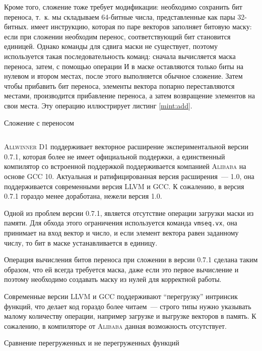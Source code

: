 Кроме того, сложение тоже требует модификации: необходимо сохранить бит переноса, т.~к. мы складываем 64-битные числа, представленные как пары 32-битных.
\riscv{} имеет инструкцию, которая по паре векторов заполняет битовую маску: если при сложении необходим перенос, соответствующий бит становится единицей.
Однако команды для сдвига маски не существует, поэтому используется такая последовательность команд: сначала вычисляется маска переноса, затем, с помощью операции И в маске оставляются только биты на нулевом и втором местах, после этого выполняется обычное сложение.
Затем чтобы прибавить бит переноса, элементы вектора попарно переставляются местами, производится прибавление переноса, а затем возвращение элементов на свои места.
Эту операцию иллюстрирует листинг \ref{mint:add}.
\begin{listing}
	\caption{Сложение с переносом}
	\label{mint:add}
	\inputminted[breaklines, frame=single]{c}{figures/add.c}
\end{listing}

\textsc{Allwinner D1} поддерживает векторное расширение \riscv{} экспериментальной версии 0.7.1, которая более не имеет официальной поддержки, а единственный компилятор со встроенной поддержкой поддерживается компанией \textsc{Alibaba} на основе \textsc{GCC 10}.
Актуальная и ратифицированная версия расширения~--- 1.0, она поддерживается современными версия \textsc{LLVM} и \textsc{GCC}.
К сожалению, в версия 0.7.1 гораздо менее доработана, нежели версия 1.0.

Одной из проблем версии 0.7.1, является отсутствие операции загрузки маски из памяти.
Для обхода этого ограничения используется команда \texttt{vmseq.vx}, она принимает на вход вектор и число, и если элемент вектора равен заданному числу, то бит в маске устанавливается в единицу.

Операция вычисления битов переноса при сложении в версии 0.7.1 сделана таким образом, что ей всегда требуется маска, даже если это первое вычисление и поэтому необходимо создавать маску из нулей для корректной работы.

Современные версии \textsc{LLVM} и \textsc{GCC} поддерживают \enquote{перегрузку} интринсик функций, что делает код гораздо более читаем~--- строго типы нужно указывать малому количеству операции, например загрузке и выгрузке векторов в память.
К сожалению, в компиляторе от \textsc{Alibaba} данная возможность отсутствует.
\begin{listing}
	\caption{Сравнение перегруженных и не перегруженных функций}
	\inputminted[breaklines, frame=single]{c}{figures/generic.c}
\end{listing}

